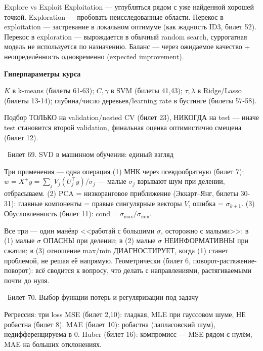 \documentclass[12pt, a4paper]{article}
\newcommand{\bilet}[2]{%
  \vspace{10pt}%
  \noindent\colorbox{qcolor}{\parbox{\dimexpr\linewidth-2\fboxsep\relax}{%
    \color{white}\large\bfseries\strut\ Билет #1. #2%
  }}%
  \nopagebreak\vspace{5pt}\par\nopagebreak%
}
\newcommand{\qsub}[1]{%
  \vspace{5pt}%
  {\bfseries\color{defblue} #1}%
  \par\vspace{2pt}%
}
\begin{document}
\begin{propbox}{Explore vs Exploit}
Exploitation --- углубляться рядом с уже найденной хорошей точкой. Exploration --- пробовать неисследованные области. Перекос в exploitation --- застревание в локальном оптимуме (как жадность ID3, билет 52). Перекос в exploration --- вырождается в обычный random search, суррогатная модель не используется по назначению. Баланс --- через ожидаемое качество + неопределённость одновременно (expected improvement).
\end{propbox}

\qsub{Гиперпараметры курса}
$K$ в k-means (билеты 61-63); $C,\gamma$ в SVM (билеты 41,43); $\tau,\lambda$ в Ridge/Lasso (билеты 13-14); глубина/число деревьев/learning rate в бустинге (билеты 57-58).

\begin{fishkabox}
Подбор ТОЛЬКО на validation/nested CV (билет 23), НИКОГДА на test --- иначе test становится второй validation, финальная оценка оптимистично смещена (билет 12).
\end{fishkabox}

\bilet{69}{SVD в машинном обучении: единый взгляд}

\begin{thmbox}{Три применения --- одна операция}
(1) МНК через псевдообратную (билет 7): $w=X^+y=\sum_j V_j(U_j^\top y)/\sigma_j$ --- малые $\sigma_j$ взрывают шум при делении, отбрасываем. (2) PCA = низкоранговое приближение (Эккарт--Янг, билеты 30-31): главные компоненты = правые сингулярные векторы $V$, ошибка = $\sigma_{k+1}$. (3) Обусловленность (билет 11): $\text{cond}=\sigma_{\max}/\sigma_{\min}$.
\end{thmbox}

\begin{fishkabox}
Все три --- один манёвр <<работай с большими $\sigma$, осторожно с малыми>>: в (1) малые $\sigma$ ОПАСНЫ при делении; в (2) малые $\sigma$ НЕИНФОРМАТИВНЫ при сжатии; в (3) отношение max/min ДИАГНОСТИРУЕТ, когда (1) станет проблемой, не решая её напрямую. Геометрически (билет 6, поворот-растяжение-поворот): всё сводится к вопросу, что делать с направлениями, растягиваемыми почти до нуля.
\end{fishkabox}

\bilet{70}{Выбор функции потерь и регуляризации под задачу}

\begin{defbox}{Регрессия: три loss}
MSE (билет 2,10): гладкая, MLE при гауссовом шуме, НЕ робастна (билет 8). MAE (билет 10): робастна (лапласовский шум), недифференцируема в 0. Huber (билет 16): компромисс --- MSE рядом с нулём, MAE на больших отклонениях.
\end{defbox}
\end{document}
